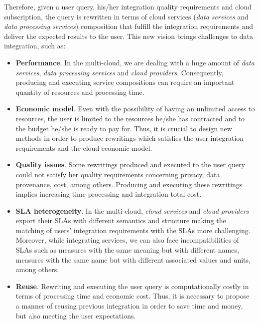 Therefore, given a user query, his/her integration quality requirements and cloud subscription, the query is rewritten in terms of cloud services (\textit{data services} and \textit{data processing services}) composition that fulfill the integration requirements and deliver the expected results to the user. This new vision brings challenges to data integration, such as:
\begin{itemize}
\item \textbf{Performance}. In the multi-cloud, we are dealing with a huge amount of \textit{data services}, \textit{data processing services} and \textit{cloud providers}. Consequently, producing and executing service compositions can require an important quantity of resources and processing time.
\item \textbf{Economic model}. Even with the possibility of having an unlimited access to resources, the user is limited to the resources he/she has contracted and to the budget he/she is ready to pay for. Thus, it is crucial to design new methods in order to produce rewritings which satisfies the user integration requirements and the cloud economic model. 
\item \textbf{Quality issues}. Some rewritings produced and executed to the user query could not satisfy her quality requirements concerning privacy, data provenance, cost, among others. Producing and executing these rewritings implies increasing time processing and integration total cost. 
\item \textbf{SLA heterogeneity}. In the multi-cloud, \textit{cloud services} and \textit{cloud providers} export their SLAs with different semantics and structure making the matching of users' integration requirements with the SLAs more challenging. Moreover, while integrating services, we can also face incompatibilities of SLAs such as measures with the same meaning but with different names, measures with the same name but with different associated values and units, among others.
\item \textbf{Reuse}. Rewriting and executing the user query is computationally costly in terms of processing time and economic cost. Thus, it is necessary to propose a manner of reusing previous integration in order to save time and money, but also meeting the user expectations.
\end{itemize}

